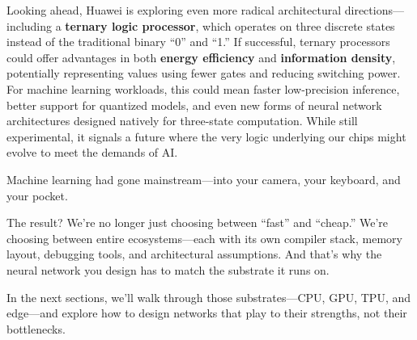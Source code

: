 \noindent Looking ahead, Huawei is exploring even more radical architectural directions—including a \textbf{ternary logic processor}, which operates on three discrete states instead of the traditional binary “0” and “1.” If successful, ternary processors could offer advantages in both \textbf{energy efficiency} and \textbf{information density}, potentially representing values using fewer gates and reducing switching power. For machine learning workloads, this could mean faster low-precision inference, better support for quantized models, and even new forms of neural network architectures designed natively for three-state computation. While still experimental, it signals a future where the very logic underlying our chips might evolve to meet the demands of AI.


Machine learning had gone mainstream—into your camera, your keyboard, and your pocket.

\noindent The result? We’re no longer just choosing between “fast” and “cheap.” We’re choosing between entire ecosystems—each with its own compiler stack, memory layout, debugging tools, and architectural assumptions. And that’s why the neural network you design has to match the substrate it runs on.

In the next sections, we’ll walk through those substrates—CPU, GPU, TPU, and edge—and explore how to design networks that play to their strengths, not their bottlenecks.


